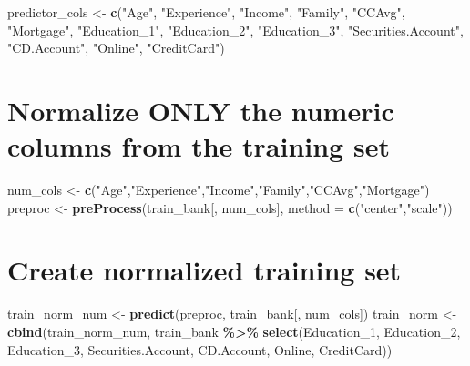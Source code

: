 \documentclass[
]{article}
\newenvironment{Shaded}{\begin{snugshade}}{\end{snugshade}}
\newcommand{\AttributeTok}[1]{\textcolor[rgb]{0.13,0.29,0.53}{#1}}
\newcommand{\FunctionTok}[1]{\textcolor[rgb]{0.13,0.29,0.53}{\textbf{#1}}}
\newcommand{\NormalTok}[1]{#1}
\newcommand{\OtherTok}[1]{\textcolor[rgb]{0.56,0.35,0.01}{#1}}
\newcommand{\SpecialCharTok}[1]{\textcolor[rgb]{0.81,0.36,0.00}{\textbf{#1}}}
\newcommand{\StringTok}[1]{\textcolor[rgb]{0.31,0.60,0.02}{#1}}
\begin{document}
\begin{Shaded}
\begin{Highlighting}[]
\NormalTok{predictor\_cols }\OtherTok{\textless{}{-}} \FunctionTok{c}\NormalTok{(}\StringTok{"Age"}\NormalTok{, }\StringTok{"Experience"}\NormalTok{, }\StringTok{"Income"}\NormalTok{, }\StringTok{"Family"}\NormalTok{, }\StringTok{"CCAvg"}\NormalTok{, }\StringTok{"Mortgage"}\NormalTok{,}
                   \StringTok{"Education\_1"}\NormalTok{, }\StringTok{"Education\_2"}\NormalTok{, }\StringTok{"Education\_3"}\NormalTok{,}
                   \StringTok{"Securities.Account"}\NormalTok{, }\StringTok{"CD.Account"}\NormalTok{, }\StringTok{"Online"}\NormalTok{, }\StringTok{"CreditCard"}\NormalTok{)}
\end{Highlighting}
\end{Shaded}

\section{Normalize ONLY the numeric columns from the training
set}\label{normalize-only-the-numeric-columns-from-the-training-set}

\begin{Shaded}
\begin{Highlighting}[]
\NormalTok{num\_cols }\OtherTok{\textless{}{-}} \FunctionTok{c}\NormalTok{(}\StringTok{"Age"}\NormalTok{,}\StringTok{"Experience"}\NormalTok{,}\StringTok{"Income"}\NormalTok{,}\StringTok{"Family"}\NormalTok{,}\StringTok{"CCAvg"}\NormalTok{,}\StringTok{"Mortgage"}\NormalTok{)}
\NormalTok{preproc }\OtherTok{\textless{}{-}} \FunctionTok{preProcess}\NormalTok{(train\_bank[, num\_cols], }\AttributeTok{method =} \FunctionTok{c}\NormalTok{(}\StringTok{"center"}\NormalTok{,}\StringTok{"scale"}\NormalTok{))}
\end{Highlighting}
\end{Shaded}

\section{Create normalized training
set}\label{create-normalized-training-set}

\begin{Shaded}
\begin{Highlighting}[]
\NormalTok{train\_norm\_num }\OtherTok{\textless{}{-}} \FunctionTok{predict}\NormalTok{(preproc, train\_bank[, num\_cols])}
\NormalTok{train\_norm }\OtherTok{\textless{}{-}} \FunctionTok{cbind}\NormalTok{(train\_norm\_num, }
\NormalTok{                   train\_bank }\SpecialCharTok{\%\textgreater{}\%} \FunctionTok{select}\NormalTok{(Education\_1, Education\_2, Education\_3,}
\NormalTok{                                        Securities.Account, CD.Account, Online, CreditCard))}
\end{Highlighting}
\end{Shaded}
\end{document}

